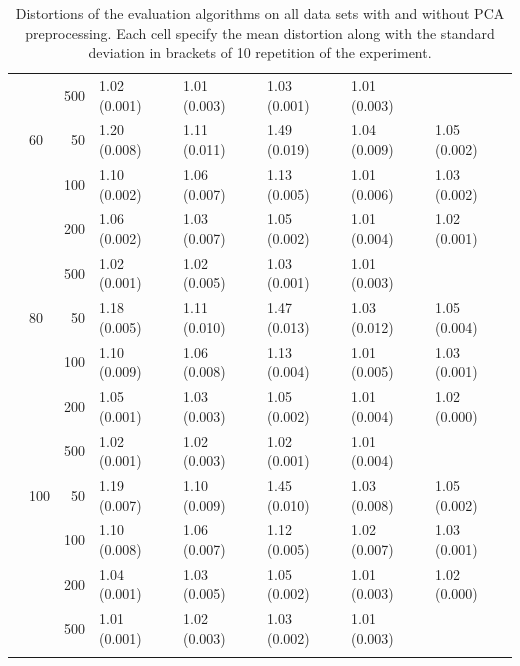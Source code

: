 \begin{longtable}{p{}lrlllll}
      &     & 500 &   1.02 (0.001) &   1.01 (0.003) &   1.03 (0.001) &         1.01 (0.003) &            \\
      & 60  & 50  &   1.20 (0.008) &   1.11 (0.011) &   1.49 (0.019) &         1.04 (0.009) &  1.05 (0.002) \\
      &     & 100 &   1.10 (0.002) &   1.06 (0.007) &   1.13 (0.005) &         1.01 (0.006) &  1.03 (0.002) \\
      &     & 200 &   1.06 (0.002) &   1.03 (0.007) &   1.05 (0.002) &         1.01 (0.004) &  1.02 (0.001) \\
      &     & 500 &   1.02 (0.001) &   1.02 (0.005) &   1.03 (0.001) &         1.01 (0.003) &            \\
      & 80  & 50  &   1.18 (0.005) &   1.11 (0.010) &   1.47 (0.013) &         1.03 (0.012) &  1.05 (0.004) \\
      &     & 100 &   1.10 (0.009) &   1.06 (0.008) &   1.13 (0.004) &         1.01 (0.005) &  1.03 (0.001) \\
      &     & 200 &   1.05 (0.001) &   1.03 (0.003) &   1.05 (0.002) &         1.01 (0.004) &  1.02 (0.000) \\
      &     & 500 &   1.02 (0.001) &   1.02 (0.003) &   1.02 (0.001) &         1.01 (0.004) &            \\
      & 100 & 50  &   1.19 (0.007) &   1.10 (0.009) &   1.45 (0.010) &         1.03 (0.008) &  1.05 (0.002) \\
      &     & 100 &   1.10 (0.008) &   1.06 (0.007) &   1.12 (0.005) &         1.02 (0.007) &  1.03 (0.001) \\
      &     & 200 &   1.04 (0.001) &   1.03 (0.005) &   1.05 (0.002) &         1.01 (0.003) &  1.02 (0.000) \\
      &     & 500 &   1.01 (0.001) &   1.02 (0.003) &   1.03 (0.002) &         1.01 (0.003) &            \\
\bottomrule
\caption{Distortions of the evaluation algorithms on all data sets with and without PCA preprocessing. Each cell specify the mean distortion along with the standard deviation in brackets of 10 repetition of the experiment.}
\label{tab:distortions-mean-std}
\end{longtable}




